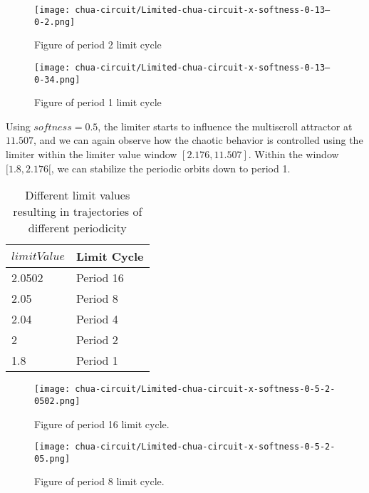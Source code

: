 \documentclass[main]{subfiles}
\begin{document}
\begin{figure}[H]
\centering
\texttt{[image: chua-circuit/Limited-chua-circuit-x-softness-0-13--0-2.png]}
\caption[Figure of period 3 limit cycle]{Figure of period 2 limit cycle}
\label{figure:x-0.13-2-limit-cycle-upperscroll-trajectory}
\end{figure}

\begin{figure}[H]
\centering
\texttt{[image: chua-circuit/Limited-chua-circuit-x-softness-0-13--0-34.png]}
\caption[Figure of period 1 limit cycle]{Figure of period 1 limit cycle}
\label{figure:x-0.13-1-limit-cycle-upperscroll-trajectory}
\end{figure}

Using \(softness=0.5\), the limiter starts to influence the multiscroll attractor at \(11.507\), and we can again observe how the chaotic behavior is controlled using the limiter within the limiter value window \([2.176,11.507]\). Within the window \([1.8,2.176[\), we can stabilize the periodic orbits down to period 1.

\begin{table}[H]
\renewcommand{\arraystretch}{1.2}
\center
\begin{tabular}{@{}ll@{}}
	\toprule
   \(limitValue\) & Limit Cycle\\
   \midrule
   2.0502 & Period 16 \\
   2.05 & Period 8 \\ 
   2.04 & Period 4 \\
   2  & Period 2 \\
   1.8 & Period 1 \\
   \bottomrule
\end{tabular}
\caption{Different limit values resulting in trajectories of different periodicity}
\label{table:x-0.5-lowermost-periodicities}
\end{table}

\begin{figure}[H]
\centering
\texttt{[image: chua-circuit/Limited-chua-circuit-x-softness-0-5-2-0502.png]}
\caption[Figure of period 16 limit cycle]{Figure of period 16 limit cycle.}
\label{figure:x-0.5-16-limit-cycle-trajectory}
\end{figure}

\begin{figure}[H]
\centering
\texttt{[image: chua-circuit/Limited-chua-circuit-x-softness-0-5-2-05.png]}
\caption[Figure of period 8 limit cycle]{Figure of period 8 limit cycle.}
\label{figure:x-0.5-8-limit-cycle-trajectory}
\end{figure}
\end{document}
